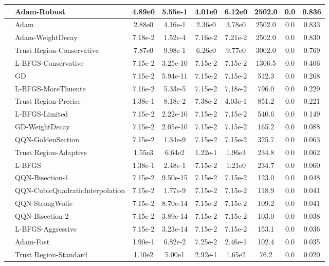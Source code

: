 \documentclass{article}
\begin{document}
\begin{longtable}{|l|l|c|c|c|c|c|c|c|}
\hline
 & Adam-Robust & 4.89e0 & 5.55e-1 & 4.01e0 & 6.12e0 & 2502.0 & 0.0 & 0.836 \\
\hline
 & Adam & 2.88e0 & 4.16e-1 & 2.36e0 & 3.78e0 & 2502.0 & 0.0 & 0.833 \\
\hline
 & Adam-WeightDecay & 7.18e-2 & 1.52e-4 & 7.16e-2 & 7.21e-2 & 2502.0 & 0.0 & 0.830 \\
\hline
 & Trust Region-Conservative & 7.87e0 & 9.98e-1 & 6.26e0 & 9.77e0 & 3002.0 & 0.0 & 0.769 \\
\hline
 & L-BFGS-Conservative & 7.15e-2 & 3.25e-10 & 7.15e-2 & 7.15e-2 & 1306.5 & 0.0 & 0.406 \\
\hline
 & GD & 7.15e-2 & 5.94e-11 & 7.15e-2 & 7.15e-2 & 512.3 & 0.0 & 0.268 \\
\hline
 & L-BFGS-MoreThuente & 7.16e-2 & 5.33e-5 & 7.15e-2 & 7.18e-2 & 796.0 & 0.0 & 0.229 \\
\hline
 & Trust Region-Precise & 1.38e-1 & 8.18e-2 & 7.38e-2 & 4.03e-1 & 851.2 & 0.0 & 0.221 \\
\hline
 & L-BFGS-Limited & 7.15e-2 & 2.22e-10 & 7.15e-2 & 7.15e-2 & 540.6 & 0.0 & 0.149 \\
\hline
 & GD-WeightDecay & 7.15e-2 & 2.05e-10 & 7.15e-2 & 7.15e-2 & 165.2 & 0.0 & 0.088 \\
\hline
 & QQN-GoldenSection & 7.15e-2 & 1.34e-9 & 7.15e-2 & 7.15e-2 & 325.7 & 0.0 & 0.063 \\
\hline
 & Trust Region-Adaptive & 1.55e3 & 6.64e2 & 1.22e-1 & 1.96e3 & 234.8 & 0.0 & 0.062 \\
\hline
 & L-BFGS & 1.38e-1 & 2.48e-1 & 7.15e-2 & 1.21e0 & 234.7 & 0.0 & 0.060 \\
\hline
 & QQN-Bisection-1 & 7.15e-2 & 9.50e-15 & 7.15e-2 & 7.15e-2 & 123.0 & 0.0 & 0.048 \\
\hline
 & QQN-CubicQuadraticInterpolation & 7.15e-2 & 1.77e-9 & 7.15e-2 & 7.15e-2 & 118.9 & 0.0 & 0.041 \\
\hline
 & QQN-StrongWolfe & 7.15e-2 & 8.70e-14 & 7.15e-2 & 7.15e-2 & 109.2 & 0.0 & 0.041 \\
\hline
 & QQN-Bisection-2 & 7.15e-2 & 3.89e-14 & 7.15e-2 & 7.15e-2 & 103.0 & 0.0 & 0.038 \\
\hline
 & L-BFGS-Aggressive & 7.15e-2 & 3.23e-14 & 7.15e-2 & 7.15e-2 & 153.1 & 0.0 & 0.036 \\
\hline
 & Adam-Fast & 1.90e-1 & 6.82e-2 & 7.25e-2 & 2.46e-1 & 102.4 & 0.0 & 0.035 \\
\hline
 & Trust Region-Standard & 1.10e2 & 5.00e1 & 2.92e-1 & 1.65e2 & 76.2 & 0.0 & 0.020 \\

\end{longtable}
\end{document}
